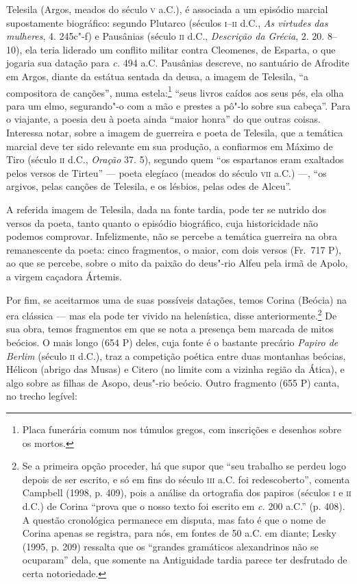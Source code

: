 Telesila (Argos, meados do século \textsc{v} a.C.), é associada a um episódio marcial
supostamente biográfico: segundo Plutarco (séculos \textsc{i}--\textsc{ii} d.C., \textit{As
virtudes das mulheres}, 4. 245c"-f) e Pausânias (século \textsc{ii} d.C.,
\textit{Descrição da Grécia}, 2. 20. 8--10), ela teria liderado um conflito
militar contra Cleomenes, de Esparta, o que jogaria sua datação para \textit{c.}
494 a.C. Pausânias descreve, no santuário de Afrodite em Argos, diante da
estátua sentada da deusa, a imagem de Telesila, ``a compositora de
canções”, numa estela:\footnote{ Placa funerária comum nos túmulos gregos, com
inscrições e desenhos sobre os mortos.} ``seus livros caídos aos seus
pés, ela olha para um elmo, segurando"-o com a mão e prestes a pô"-lo sobre sua
cabeça”. Para o viajante, a poesia deu à poeta ainda ``maior honra” do
que outras coisas. Interessa notar, sobre a imagem de guerreira e poeta de
Telesila, que a temática marcial deve ter sido relevante em sua produção, a
confiarmos em Máximo de Tiro (século \textsc{ii} d.C., \textit{Oração} 37. 5), segundo
quem ``os espartanos eram exaltados pelos versos de Tirteu” --- 
poeta elegíaco (meados do século \textsc{vii} a.C.) ---, ``os argivos, pelas
canções de Telesila, e os lésbios, pelas odes de Alceu”. 

A referida imagem de Telesila, dada na fonte tardia, pode ter se nutrido dos
versos da poeta, tanto quanto o episódio biográfico, cuja historicidade não
podemos comprovar. Infelizmente, não se percebe a temática guerreira na obra
remanescente da poeta: cinco fragmentos, o maior, com dois versos (Fr.~717 P),
ao que se percebe, sobre o mito da paixão do deus"-rio Alfeu pela irmã de Apolo,
a virgem caçadora Ártemis.

Por fim, se aceitarmos uma de suas possíveis datações, temos Corina (Beócia) na
era clássica --- mas ela pode ter vivido na helenística, disse
anteriormente.\footnote{ Se a primeira opção proceder, há que supor que “seu
trabalho se perdeu logo depois de ser escrito, e só em fins do século \textsc{iii} a.C.
foi redescoberto”, comenta Campbell (1998, p. 409), pois a análise da
ortografia dos papiros (séculos \textsc{i} e \textsc{ii} d.C.) de Corina “prova que o nosso texto
foi escrito em \textit{c.} 200 a.C.” (p. 408). A questão cronológica permanece
em disputa, mas fato é que o nome de Corina apenas se registra, para nós, em
fontes de 50 a.C. em diante; Lesky (1995, p. 209) ressalta que os “grandes
gramáticos alexandrinos não se ocuparam” dela, que somente na Antiguidade
tardia parece ter desfrutado de certa notoriedade.} De sua obra, temos
fragmentos em que se nota a presença bem marcada de mitos beócios. O mais longo
(654 P) deles, cuja fonte é o bastante precário \textit{Papiro de Berlim}
(século \textsc{ii} d.C.), traz a competição poética entre duas montanhas beócias,
Hélicon (abrigo das Musas) e Citero (no limite com a vizinha região da Ática),
e algo sobre as filhas de Asopo, deus"-rio beócio. Outro fragmento (655 P)
canta, no trecho legível:

